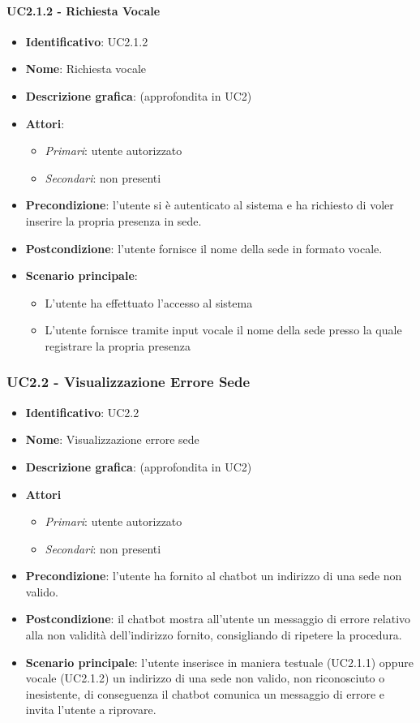 \paragraph{UC2.1.2 - Richiesta Vocale}
\begin{itemize}
   \item \textbf{Identificativo}: UC2.1.2
   \item \textbf{Nome}: Richiesta vocale
   \item \textbf{Descrizione grafica}: (approfondita in UC2)
   \item \textbf{Attori}:
   \begin{itemize} 
       \item \textit{Primari}: utente autorizzato
       \item \textit{Secondari}: non presenti
   \end{itemize}
       \item \textbf{Precondizione}: l'utente si è autenticato al sistema e ha richiesto di voler inserire la propria presenza in sede. 
       \item \textbf{Postcondizione}: l'utente fornisce il nome della sede in formato vocale. 
    \item \textbf{Scenario principale}: 
       \begin{itemize}
           \item L'utente ha effettuato l'accesso al sistema 
           \item L'utente fornisce tramite input vocale il nome della sede presso la quale registrare la propria presenza
       \end{itemize}
\end{itemize}

\subsubsection{UC2.2 - Visualizzazione Errore Sede}
\begin{itemize}
    \item \textbf{Identificativo}: UC2.2
    \item \textbf{Nome}: Visualizzazione errore sede
    \item \textbf{Descrizione grafica}: (approfondita in UC2)
    \item \textbf{Attori}
 \begin{itemize} 
    \item \textit{Primari}: utente autorizzato
    \item \textit{Secondari}: non presenti
 \end{itemize}
 \item \textbf{Precondizione}: l'utente ha fornito al chatbot un indirizzo di una sede non valido.
 \item \textbf{Postcondizione}: il chatbot mostra all'utente un messaggio di errore relativo alla non validità dell'indirizzo fornito, consigliando di ripetere la procedura. 
 \item \textbf{Scenario principale}: l'utente inserisce in maniera testuale (UC2.1.1) oppure vocale (UC2.1.2) un indirizzo di una sede non valido, non riconosciuto o inesistente, di conseguenza il chatbot comunica un messaggio di errore e invita l'utente a riprovare. 
\end{itemize}
\newpage